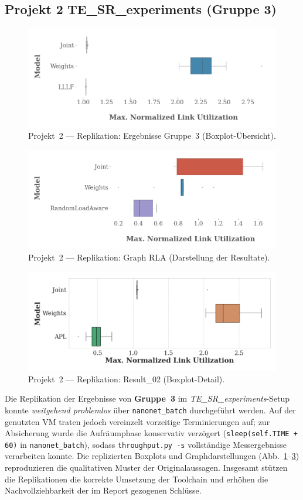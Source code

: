 \documentclass[sigconf,nonacm,review]{acmart}
\begin{document}
\subsection{Projekt 2\,\textemdash\,TE\_SR\_experiments (Gruppe 3)}
\begin{figure}[H]
  \centering
  \includegraphics[width=.9\linewidth]{results.png}
  \caption{Projekt~2 — Replikation: Ergebnisse Gruppe~3 (Boxplot-Übersicht).}
  \label{fig:p2-repl-results}
\end{figure}
\begin{figure}[H]
  \centering
  \includegraphics[width=.9\linewidth]{GraphRLA.png}
  \caption{Projekt~2 — Replikation: Graph RLA (Darstellung der Resultate).}
  \label{fig:p2-repl-graph}
\end{figure}
\begin{figure}[H]
  \centering
  \includegraphics[width=.9\linewidth]{result_02.png}
  \caption{Projekt~2 — Replikation: Result\_02 (Boxplot-Detail).}
  \label{fig:p2-repl-detail}
\end{figure}
\FloatBarrier
\noindent
Die Replikation der Ergebnisse von \textbf{Gruppe~3} im \textit{TE\_SR\_experiments}-Setup konnte
\emph{weitgehend problemlos} über \texttt{nanonet\_batch} durchgeführt werden. Auf der genutzten
VM traten jedoch vereinzelt vorzeitige Terminierungen auf; zur Absicherung wurde die Aufräumphase
konservativ verzögert (\verb|sleep(self.TIME + 60)| in \texttt{nanonet\_batch}), sodass
\texttt{throughput.py -s} vollständige Messergebnisse verarbeiten konnte. Die replizierten
Boxplots und Graphdarstellungen (Abb.~\ref{fig:p2-repl-results}–\ref{fig:p2-repl-detail})
reproduzieren die qualitativen Muster der Originalaussagen.
Insgesamt stützen die Replikationen die korrekte Umsetzung der
Toolchain und erhöhen die Nachvollziehbarkeit der im Report gezogenen Schlüsse.
\end{document}
